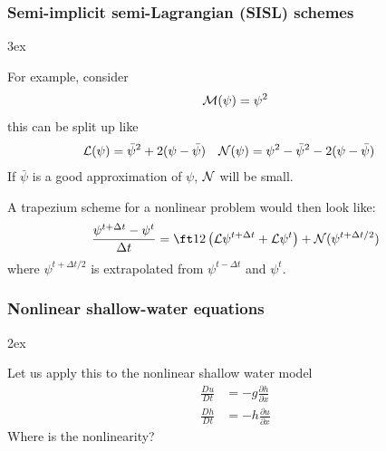 \documentclass[aspectratio=149,9pt]{beamer}
\begin{document}
\begin{frame}
	\frametitle{Semi-implicit semi-Lagrangian (SISL) schemes}
	\begin{myitemize}{3ex}
		\item For example, consider
			\begin{equation*}
				{\cal M}(\psi)=\psi^2
			\end{equation*}
			this can be split up like
			\begin{align*}
				{\cal L}(\psi)&=\bar\psi^2+2(\psi-\bar{\psi})	& {\cal N}(\psi)&=\psi^2-\bar\psi^2-2(\psi-\bar{\psi})
			\end{align*}
			If $\bar \psi$ is a good approximation of $\psi$, $\cal N$ will be small.
		\item A trapezium scheme for a nonlinear problem would then look like:
			\begin{equation*}
				\frac{\psi^{t+\Delta t} - \psi^t}{\Delta t} =
				\ft12 \left(  {\cal L} \psi^{t+\Delta t} + {\cal L}\psi^{t} \right)
				+ {\cal N}(\psi^{t+\Delta t/2})
			\end{equation*}
			where $\psi^{t+\Delta t/2}$ is extrapolated from $\psi^{t-\Delta t}$ and $\psi^t$.
	\end{myitemize}
\end{frame}
%
%
\begin{frame}
	\frametitle{Nonlinear shallow-water equations}
	\begin{myitemize}{2ex}
		\item Let us apply this to the nonlinear shallow water model
			\begin{align*}
				\frac{D u}{D t} &= -g \frac{\partial h}{\partial x} \\
				\frac{D h}{D t} &= - h \frac{\partial u}{\partial x}
			\end{align*}
			Where is the nonlinearity?
	\end{myitemize}
\end{frame}
%
%
\end{document}
